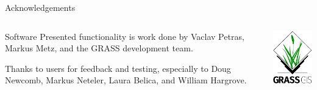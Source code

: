 \documentclass[xcolor={dvipsnames,usenames},beamer,aspectratio=169]{beamer}
\begin{document}
\begin{frame}{Acknowledgements}

\begin{columns}
\begin{column}{0.6\textwidth}

\begin{block}{Software}
Presented functionality is work done by Vaclav Petras, Markus Metz, and the GRASS development team.

\bigskip

Thanks to users for feedback and testing, especially to
Doug Newcomb, Markus Neteler, Laura Belica, and William Hargrove.
\end{block}

\end{column}
\begin{column}{0.3\textwidth}

\begin{center}
  \includegraphics[width=\textwidth]{logos/grass_gis}
\end{center}

\end{column}
\end{columns}

\end{frame}
\end{document}
